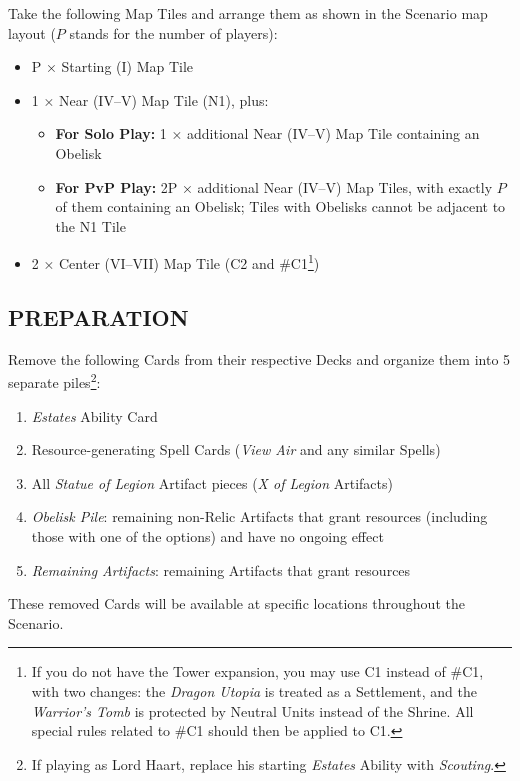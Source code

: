 \begin{multicols}{2}
Take the following Map Tiles and arrange them as shown in the Scenario map layout ($P$ stands for the number of players):
\begin{itemize}
  \item P × Starting (I) Map Tile
  \item 1 × Near (IV--V) Map Tile (N1), plus:
  \begin{itemize}
    \item \textbf{For Solo Play:} 1 × additional Near (IV--V) Map Tile containing an Obelisk
    \item \textbf{For PvP Play:} 2P × additional Near (IV--V) Map Tiles, with exactly $P$ of them containing an Obelisk; Tiles with Obelisks cannot be adjacent to the N1 Tile
  \end{itemize}
  \item 2 × Center (VI--VII) Map Tile (C2 and \#C1\footnote{If you do not have the Tower expansion, you may use C1 instead of \#C1, with two changes: the \textit{Dragon Utopia} is treated as a Settlement, and the \textit{Warrior's Tomb} is protected by Neutral Units instead of the Shrine. All special rules related to \#C1 should then be applied to C1.})
\end{itemize}
\subsection*{\MakeUppercase{Preparation}}

Remove the following Cards from their respective Decks and organize them into 5 separate piles\footnote{If playing as Lord Haart, replace his starting \textit{Estates} Ability with \textit{Scouting}.}:
  
\begin{enumerate}
  \item \textit{Estates} Ability Card
  \item Resource-generating Spell Cards (\textit{View Air} and any similar Spells)
  \item All \textit{Statue of Legion} Artifact pieces (\textit{X of Legion} Artifacts)
  \item \textit{Obelisk Pile}: remaining non-Relic Artifacts that grant resources (including those with one of the options) and have no ongoing effect
  \item \textit{Remaining Artifacts}: remaining Artifacts that grant resources 
\end{enumerate}
  
These removed Cards will be available at specific locations throughout the Scenario.


\end{multicols}
